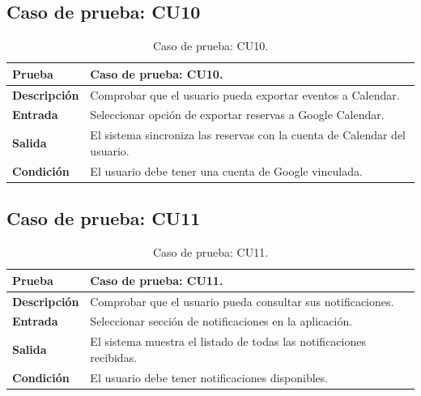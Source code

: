
\subsection{Caso de prueba: CU10}

\begin{table}[ht]
\centering
\renewcommand{\arraystretch}{1.3}
\begin{tabular}{|p{3cm}|p{12cm}|}
\hline
\rowcolor[RGB]{191,191,191}
\textbf{Prueba} & Caso de prueba: CU10. \\
\hline
\textbf{Descripción} \cellcolor[RGB]{217,217,217} & Comprobar que el usuario pueda exportar eventos a Calendar. \\
\hline
\textbf{Entrada} \cellcolor[RGB]{217,217,217} & Seleccionar opción de exportar reservas a Google Calendar. \\
\hline
\textbf{Salida} \cellcolor[RGB]{217,217,217} & El sistema sincroniza las reservas con la cuenta de Calendar del usuario. \\
\hline
\textbf{Condición} \cellcolor[RGB]{217,217,217} & El usuario debe tener una cuenta de Google vinculada. \\
\hline
\end{tabular}
\caption{Caso de prueba: CU10.}
\label{tab:cu10_black_test}
\end{table}


\subsection{Caso de prueba: CU11}

\begin{table}[ht]
\centering
\renewcommand{\arraystretch}{1.3}
\begin{tabular}{|p{3cm}|p{12cm}|}
\hline
\rowcolor[RGB]{191,191,191}
\textbf{Prueba} & Caso de prueba: CU11. \\
\hline
\textbf{Descripción} \cellcolor[RGB]{217,217,217} & Comprobar que el usuario pueda consultar sus notificaciones. \\
\hline
\textbf{Entrada} \cellcolor[RGB]{217,217,217} & Seleccionar sección de notificaciones en la aplicación. \\
\hline
\textbf{Salida} \cellcolor[RGB]{217,217,217} & El sistema muestra el listado de todas las notificaciones recibidas. \\
\hline
\textbf{Condición} \cellcolor[RGB]{217,217,217} & El usuario debe tener notificaciones disponibles. \\
\hline
\end{tabular}
\caption{Caso de prueba: CU11.}
\label{tab:cu11_black_test}
\end{table}

